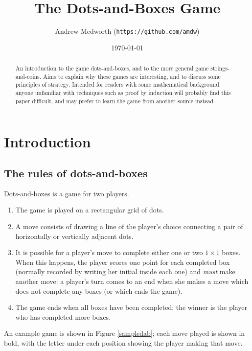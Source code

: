 \documentclass[a4paper,twocolumn]{article}
\begin{document}
\title{The Dots-and-Boxes Game}
\author{Andrew Medworth (\texttt{https://github.com/amdw})}
\date{\today}
\maketitle

\begin{abstract}
  An introduction to the game dots-and-boxes, and to the more general
  game strings-and-coins. Aims to explain why these games are
  interesting, and to discuss some principles of strategy. Intended
  for readers with some mathematical background: anyone unfamiliar
  with techniques such as proof by induction will probably find this
  paper difficult, and may prefer to learn the game from another
  source instead.
\end{abstract}

\tableofcontents

\section{Introduction}

\subsection{The rules of dots-and-boxes}

Dots-and-boxes is a game for two players.

\begin{enumerate}
  \item The game is played on a rectangular grid of dots.
  \item A move consists of drawing a line of the player's choice
    connecting a pair of horizontally or vertically adjacent dots.
  \item It is possible for a player's move to complete either one or
    two $1 \times 1$ boxes. When this happens, the player scores one
    point for each completed box (normally recorded by writing her
    initial inside each one) and \emph{must} make another move: a
    player's turn comes to an end when she makes a move which does not
    complete any boxes (or which ends the game).
  \item The game ends when all boxes have been completed; the winner
    is the player who has completed more boxes.
\end{enumerate}

An example game is shown in Figure \ref{sampledab}; each move played
is shown in bold, with the letter under each position showing the
player making that move.
\end{document}
